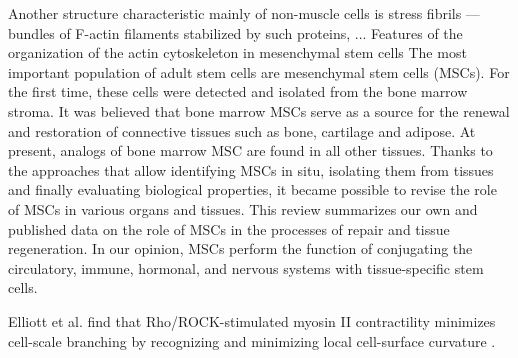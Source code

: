 \documentclass[english,authoryear]{elsarticle}
\begin{document}
Another structure characteristic mainly of non-muscle cells is stress fibrils — bundles of F-actin filaments stabilized by such proteins, ...
Features of the organization of the actin cytoskeleton in mesenchymal stem cells
The most important population of adult stem cells are mesenchymal stem cells (MSCs). For the first time, these cells were detected and isolated from the bone marrow stroma. It was believed that bone marrow MSCs serve as a source for the renewal and restoration of connective tissues such as bone, cartilage and adipose. At present, analogs of bone marrow MSC are found in all other tissues. Thanks to the approaches that allow identifying MSCs in situ, isolating them from tissues and finally evaluating biological properties, it became possible to revise the role of MSCs in various organs and tissues. This review summarizes our own and published data on the role of MSCs in the processes of repair and tissue regeneration. In our opinion, MSCs perform the function of conjugating the circulatory, immune, hormonal, and nervous systems with tissue-specific stem cells.


Elliott et al. find that Rho/ROCK-stimulated myosin II contractility minimizes cell-scale branching by recognizing and minimizing local cell-surface curvature \cite{elliott2015myosin}.
\end{document}
